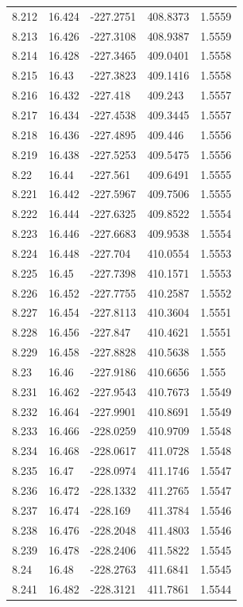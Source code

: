 \begin{tabular}{lllll}
8.212 & 16.424 & -227.2751 & 408.8373 & 1.5559 \\
8.213 & 16.426 & -227.3108 & 408.9387 & 1.5559 \\
8.214 & 16.428 & -227.3465 & 409.0401 & 1.5558 \\
8.215 & 16.43 & -227.3823 & 409.1416 & 1.5558 \\
8.216 & 16.432 & -227.418 & 409.243 & 1.5557 \\
8.217 & 16.434 & -227.4538 & 409.3445 & 1.5557 \\
8.218 & 16.436 & -227.4895 & 409.446 & 1.5556 \\
8.219 & 16.438 & -227.5253 & 409.5475 & 1.5556 \\
8.22 & 16.44 & -227.561 & 409.6491 & 1.5555 \\
8.221 & 16.442 & -227.5967 & 409.7506 & 1.5555 \\
8.222 & 16.444 & -227.6325 & 409.8522 & 1.5554 \\
8.223 & 16.446 & -227.6683 & 409.9538 & 1.5554 \\
8.224 & 16.448 & -227.704 & 410.0554 & 1.5553 \\
8.225 & 16.45 & -227.7398 & 410.1571 & 1.5553 \\
8.226 & 16.452 & -227.7755 & 410.2587 & 1.5552 \\
8.227 & 16.454 & -227.8113 & 410.3604 & 1.5551 \\
8.228 & 16.456 & -227.847 & 410.4621 & 1.5551 \\
8.229 & 16.458 & -227.8828 & 410.5638 & 1.555 \\
8.23 & 16.46 & -227.9186 & 410.6656 & 1.555 \\
8.231 & 16.462 & -227.9543 & 410.7673 & 1.5549 \\
8.232 & 16.464 & -227.9901 & 410.8691 & 1.5549 \\
8.233 & 16.466 & -228.0259 & 410.9709 & 1.5548 \\
8.234 & 16.468 & -228.0617 & 411.0728 & 1.5548 \\
8.235 & 16.47 & -228.0974 & 411.1746 & 1.5547 \\
8.236 & 16.472 & -228.1332 & 411.2765 & 1.5547 \\
8.237 & 16.474 & -228.169 & 411.3784 & 1.5546 \\
8.238 & 16.476 & -228.2048 & 411.4803 & 1.5546 \\
8.239 & 16.478 & -228.2406 & 411.5822 & 1.5545 \\
8.24 & 16.48 & -228.2763 & 411.6841 & 1.5545 \\
8.241 & 16.482 & -228.3121 & 411.7861 & 1.5544 \\

\end{tabular}
